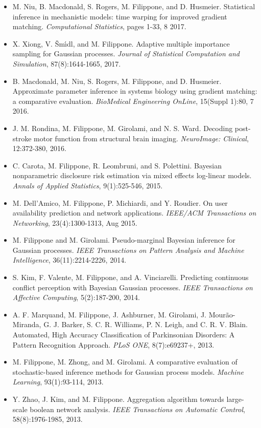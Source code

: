 \begin{itemize}
\item  M. Niu, B. Macdonald, S. Rogers, M. Filippone, and D. Husmeier. Statistical inference in mechanistic models: time warping for improved gradient matching. \emph{Computational Statistics}, pages 1-33, 8 2017.  
\item  X. Xiong, V. Šm\'{\i}dl, and M. Filippone. Adaptive multiple importance sampling for Gaussian processes. \emph{Journal of Statistical Computation and Simulation}, 87(8):1644-1665, 2017.  
\item  B. Macdonald, M. Niu, S. Rogers, M. Filippone, and D. Husmeier. Approximate parameter inference in systems biology using gradient matching: a comparative evaluation. \emph{BioMedical Engineering OnLine}, 15(Suppl 1):80, 7 2016.  
\item  J. M. Rondina, M. Filippone, M. Girolami, and N. S. Ward. Decoding post-stroke motor function from structural brain imaging. \emph{NeuroImage: Clinical}, 12:372-380, 2016.  
\item  C. Carota, M. Filippone, R. Leombruni, and S. Polettini. Bayesian nonparametric disclosure risk estimation via mixed effects log-linear models. \emph{Annals of Applied Statistics}, 9(1):525-546, 2015.  
\item  M. Dell'Amico, M. Filippone, P. Michiardi, and Y. Roudier. On user availability prediction and network applications. \emph{IEEE/ACM Transactions on Networking}, 23(4):1300-1313, Aug 2015.  
\item  M. Filippone and M. Girolami. Pseudo-marginal Bayesian inference for Gaussian processes. \emph{IEEE Transactions on Pattern Analysis and Machine Intelligence}, 36(11):2214-2226, 2014.  
\item  S. Kim, F. Valente, M. Filippone, and A. Vinciarelli. Predicting continuous conflict perception with Bayesian Gaussian processes. \emph{IEEE Transactions on Affective Computing}, 5(2):187-200, 2014.  
\item  A. F. Marquand, M. Filippone, J. Ashburner, M. Girolami, J. Mour\~ao-Miranda, G. J. Barker, S. C. R. Williams, P. N. Leigh, and C. R. V. Blain. Automated, High Accuracy Classification of Parkinsonian Disorders: A Pattern Recognition Approach. \emph{PLoS ONE}, 8(7):e69237+, 2013.  
\item  M. Filippone, M. Zhong, and M. Girolami. A comparative evaluation of stochastic-based inference methods for Gaussian process models. \emph{Machine Learning}, 93(1):93-114, 2013.  
\item  Y. Zhao, J. Kim, and M. Filippone. Aggregation algorithm towards large-scale boolean network analysis. \emph{IEEE Transactions on Automatic Control}, 58(8):1976-1985, 2013.  

\end{itemize}
